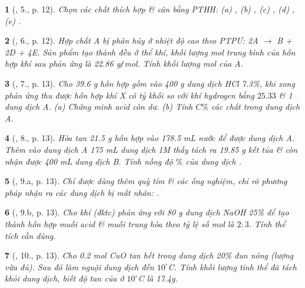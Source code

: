 \documentclass{article}
\newtheorem{baitoan}{}
\begin{document}
\begin{baitoan}[\cite{An_400_BT_Hoa_Hoc_9}, 5., p. 12]
	Chọn các chất thích hợp \& cân bằng {\rm PTHH}: {\rm(a) , (b) , (c) , (d) , (e) }.
\end{baitoan}

\begin{baitoan}[\cite{An_400_BT_Hoa_Hoc_9}, 6., p. 12]
	Hợp chất A bị phân hủy ở nhiệt độ cao theo {\rm PTPƯ: 2A $\to$ B + 2D + 4E}. Sản phẩm tạo thành đều ở thể khí, khối lượng mol trung bình của hỗn hợp khí sau phản ứng là {\rm22.86 g{\tt/}mol}. Tính khối lượng mol của A.
\end{baitoan}

\begin{baitoan}[\cite{An_400_BT_Hoa_Hoc_9}, 7., p. 13]
	Cho {\rm39.6 g} hỗn hợp gồm {\rm{}} vào {\rm400 g} dung dịch {\rm HCl 7.3\%}, khi xong phản ứng thu được hỗn hợp khí X có tỷ khối so với khí hydrogen bằng $25.33$ \& 1 dung dịch A. (a) Chứng minh acid còn dư. (b) Tính $C\%$ các chất trong dung dịch A.
\end{baitoan}

\begin{baitoan}[\cite{An_400_BT_Hoa_Hoc_9}, 8., p. 13]
	Hòa tan {\rm21.5 g} hỗn hợp {\rm{}} vào {\rm178.5 mL} nước để được dung dịch A. Thêm vào dung dịch A {\rm175 mL} dung dịch {\rm{} 1M} thấy tách ra {\rm19.85 g} kết tủa \& còn nhận được {\rm400 mL} dung dịch B. Tính nồng độ $\%$ của dung dịch {\rm{}}.
\end{baitoan}

\begin{baitoan}[\cite{An_400_BT_Hoa_Hoc_9}, 9.a, p. 13]
	Chỉ được dùng thêm quỳ tím \& các ống nghiệm, chỉ rõ phương pháp nhận ra các dung dịch bị mất nhãn: {\rm{}}.
\end{baitoan}

\begin{baitoan}[\cite{An_400_BT_Hoa_Hoc_9}, 9.b, p. 13]
	Cho khí {\rm{}} (đktc) phản ứng với {\rm80 g} dung dịch {\rm NaOH 25\%} để tạo thành hỗn hợp muối acid \& muối trung hòa theo tỷ lệ số mol là $2:3$. Tính thể tích {\rm{}} cần dùng.
\end{baitoan}

\begin{baitoan}[\cite{An_400_BT_Hoa_Hoc_9}, 10., p. 13]
	Cho {\rm0.2 mol CuO} tan hết trong dung dịch {\rm{} 20\%} đun nóng (lượng vừa đủ). Sau đó làm nguội dung dịch đến $10^\circ${\rm C}. Tính khối lượng tinh thể {\rm{}} đã tách khỏi dung dịch, biết độ tan của {\rm{}} ở $10^\circ${\rm C} là {\rm17.4g}.
\end{baitoan}
\end{document}
